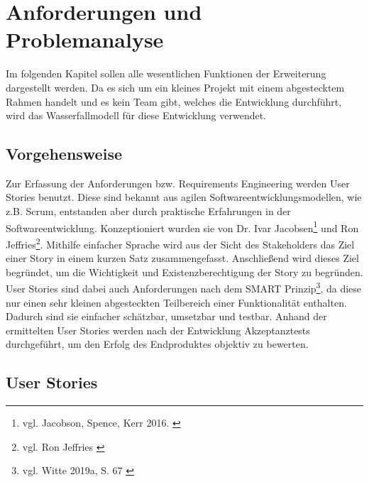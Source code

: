 \chapter{Anforderungen und Problemanalyse}
\label{ch:anforderungen}

Im folgenden Kapitel sollen alle wesentlichen Funktionen der Erweiterung dargestellt werden. Da es sich um ein kleines Projekt mit einem abgestecktem Rahmen handelt und es kein Team gibt, welches die Entwicklung durchführt, wird das Wasserfallmodell für diese Entwicklung verwendet.


\section{Vorgehensweise}

Zur Erfassung der Anforderungen bzw. Requirements Engineering werden User Stories benutzt. Diese sind bekannt aus agilen Softwareentwicklungsmodellen, wie z.B. Scrum, entstanden aber durch praktische Erfahrungen in der Softwareentwicklung.
Konzeptioniert wurden sie von Dr. Ivar Jacobsen\footnote{vgl. Jacobson, Spence, Kerr 2016. \cite{jacobson2016}} und Ron Jeffries\footnote{vgl. Ron Jeffries \cite{jeffries2022}}.
Mithilfe einfacher Sprache wird aus der Sicht des Stakeholders das Ziel einer Story in einem kurzen Satz zusammengefasst.
Anschließend wird dieses Ziel begründet, um die Wichtigkeit und Existenzberechtigung der Story zu begründen.
User Stories sind dabei auch Anforderungen nach dem SMART Prinzip\footnote{vgl. Witte 2019a, S. 67 \cite{witte2016}}, da diese nur einen sehr kleinen abgesteckten Teilbereich einer Funktionalität enthalten.
Dadurch sind sie einfacher schätzbar, umsetzbar und testbar.
Anhand der ermittelten User Stories werden nach der Entwicklung Akzeptanztests durchgeführt, um den Erfolg des Endproduktes objektiv zu bewerten.

\section{User Stories}

